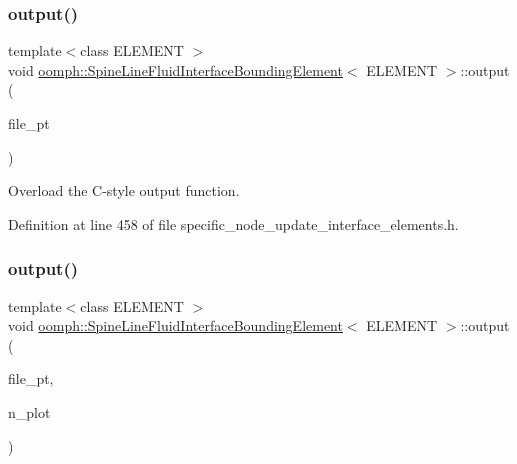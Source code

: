 \subsubsection{\texorpdfstring{output()}{output()}\hspace{0.1cm}{\footnotesize\ttfamily [3/4]}}
{\footnotesize\ttfamily template$<$class E\+L\+E\+M\+E\+NT $>$ \\
void \hyperlink{classoomph_1_1SpineLineFluidInterfaceBoundingElement}{oomph\+::\+Spine\+Line\+Fluid\+Interface\+Bounding\+Element}$<$ E\+L\+E\+M\+E\+NT $>$\+::output (\begin{DoxyParamCaption}\item[{F\+I\+LE $\ast$}]{file\+\_\+pt }\end{DoxyParamCaption})\hspace{0.3cm}{\ttfamily [inline]}}



Overload the C-\/style output function. 



Definition at line 458 of file specific\+\_\+node\+\_\+update\+\_\+interface\+\_\+elements.\+h.

\mbox{\label{classoomph_1_1SpineLineFluidInterfaceBoundingElement_ab1dbf8b8c22f78d08d431e06db80793a}} 
\subsubsection{\texorpdfstring{output()}{output()}\hspace{0.1cm}{\footnotesize\ttfamily [4/4]}}
{\footnotesize\ttfamily template$<$class E\+L\+E\+M\+E\+NT $>$ \\
void \hyperlink{classoomph_1_1SpineLineFluidInterfaceBoundingElement}{oomph\+::\+Spine\+Line\+Fluid\+Interface\+Bounding\+Element}$<$ E\+L\+E\+M\+E\+NT $>$\+::output (\begin{DoxyParamCaption}\item[{F\+I\+LE $\ast$}]{file\+\_\+pt,  }\item[{const unsigned \&}]{n\+\_\+plot }\end{DoxyParamCaption})\hspace{0.3cm}{\ttfamily [inline]}}



